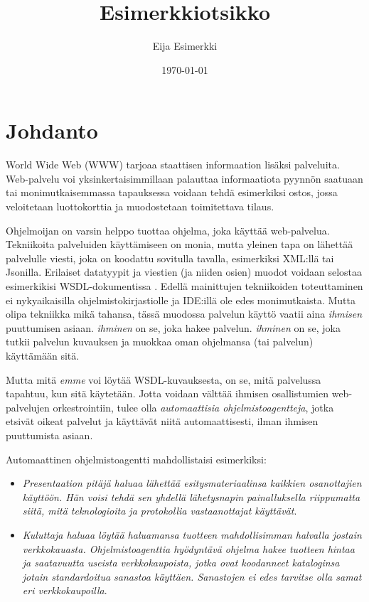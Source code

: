 \documentclass[finnish]{tktltiki2}
\title{Esimerkkiotsikko}
\author{Eija Esimerkki}
\date{\today}
\theoremstyle{definition}
\theoremstyle{remark}
\begin{document}

\maketitle        %
\makeabstract     %

\tableofcontents  %
\newpage          %



\section{Johdanto}

World Wide Web (WWW) tarjoaa staattisen informaation lisäksi palveluita. Web-palvelu voi yksinkertaisimmillaan palauttaa informaatiota pyynnön saatuaan tai monimutkaisemmassa tapauksessa voidaan tehdä  esimerkiksi ostos, jossa veloitetaan luottokorttia ja muodostetaan toimitettava tilaus\cite{with_owls}. 

Ohjelmoijan on varsin helppo tuottaa ohjelma, joka käyttää web-palvelua. Tekniikoita palveluiden käyttämiseen on monia, mutta yleinen tapa on lähettää palvelulle viesti, joka on koodattu sovitulla tavalla, esimerkiksi XML:llä tai Jsonilla. Erilaiset datatyypit ja viestien (ja niiden osien) muodot voidaan  selostaa esimerkikisi WSDL-dokumentissa \cite{WSDL}. Edellä mainittujen tekniikoiden toteuttaminen ei nykyaikaisilla ohjelmistokirjastiolle ja IDE:illä ole edes monimutkaista. Mutta olipa tekniikka mikä tahansa, tässä muodossa palvelun käyttö vaatii aina \textit{ihmisen} puuttumisen asiaan. \textit{ihminen} on se, joka hakee palvelun. \textit{ihminen} on se, joka tutkii palvelun kuvauksen ja muokkaa oman ohjelmansa (tai palvelun) käyttämään sitä. 

Mutta mitä \textit{emme} voi löytää WSDL-kuvauksesta, on se, mitä palvelussa tapahtuu, kun sitä käytetään\cite{with_owls}. Jotta voidaan välttää ihmisen osallistumien web-palvelujen orkestrointiin, tulee olla \textit{automaattisia ohjelmistoagentteja}, jotka etsivät oikeat palvelut ja käyttävät niitä automaattisesti, ilman ihmisen puuttumista asiaan\cite{with_owls}.

Automaattinen ohjelmistoagentti mahdollistaisi esimerkiksi:

\begin{itemize}
\item \textit{Presentaation pitäjä haluaa lähettää esitysmateriaalinsa kaikkien osanottajien käyttöön. Hän voisi tehdä sen yhdellä lähetysnapin painalluksella riippumatta siitä, mitä teknologioita ja protokollia vastaanottajat käyttävät}\cite{with_owls}.

\item \textit{Kuluttaja haluaa löytää haluamansa tuotteen mahdollisimman halvalla jostain verkkokauasta. Ohjelmistoagenttia hyödyntävä ohjelma hakee tuotteen hintaa ja saatavuutta useista verkkokaupoista, jotka ovat koodanneet kataloginsa jotain standardoitua sanastoa käyttäen. Sanastojen ei edes tarvitse olla samat eri verkkokaupoilla}\cite{with_owls}. 
\end{itemize}
\end{document}

